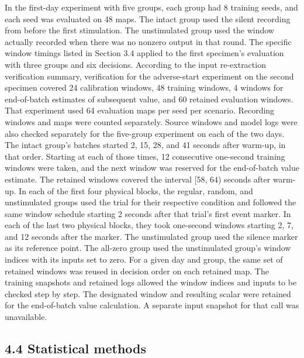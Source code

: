 \documentclass{article}
\begin{document}
In the first-day experiment with five groups, each group had 8 training seeds, and each seed was evaluated on 48 maps. The intact group used the silent recording from before the first stimulation. The unstimulated group used the window actually recorded when there was no nonzero output in that round. The specific window timings listed in Section 3.4 applied to the first specimen's evaluation with three groups and six decisions. According to the input re-extraction verification summary, verification for the adverse-start experiment on the second specimen covered 24 calibration windows, 48 training windows, 4 windows for end-of-batch estimates of subsequent value, and 60 retained evaluation windows. That experiment used 64 evaluation maps per seed per scenario. Recording windows and maps were counted separately. Source windows and model logs were also checked separately for the five-group experiment on each of the two days. The intact group's batches started 2, 15, 28, and 41 seconds after warm-up, in that order. Starting at each of those times, 12 consecutive one-second training windows were taken, and the next window was reserved for the end-of-batch value estimate. The retained windows covered the interval [58, 64) seconds after warm-up. In each of the first four physical blocks, the regular, random, and unstimulated groups used the trial for their respective condition and followed the same window schedule starting 2 seconds after that trial's first event marker. In each of the last two physical blocks, they took one-second windows starting 2, 7, and 12 seconds after the marker. The unstimulated group used the silence marker as its reference point. The all-zero group used the unstimulated group's window indices with its inputs set to zero. For a given day and group, the same set of retained windows was reused in decision order on each retained map. The training snapshots and retained logs allowed the window indices and inputs to be checked step by step. The designated window and resulting scalar were retained for the end-of-batch value calculation. A separate input snapshot for that call was unavailable.


\subsection*{4.4 Statistical methods}
\end{document}
